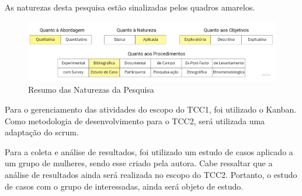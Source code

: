 As naturezas desta pesquisa estão sinalizadas pelos quadros amarelos.

\begin{figure}[ht]
	\centering
	\includegraphics[keepaspectratio=true,scale=0.3]{figuras/resumoAbordagem.pdf}
	\caption{Resumo das Naturezas da Pesquisa}
        \label{fig06}
\end{figure}

Para o gerenciamento das atividades do escopo do TCC1, foi utilizado o Kanban. Como metodologia de desenvolvimento para o TCC2, será utilizada uma adaptação do scrum.

Para a coleta e análise de resultados, foi utilizado um estudo 
de casos aplicado a um grupo de mulheres, sendo esse criado pela 
autora. Cabe ressaltar que a análise de resultados ainda será 
realizada no escopo do TCC2. Portanto, o estudo de casos com o 
grupo de interessadas, ainda será objeto de estudo.



          

